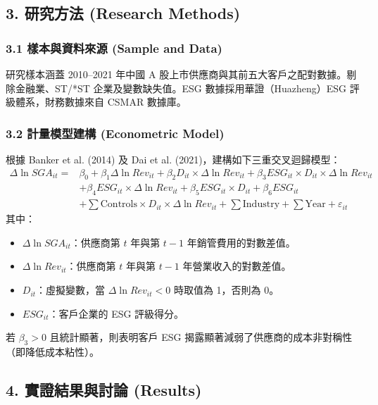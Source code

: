 \documentclass[11pt,a4paper]{article}
\begin{document}
\subsection{3. 研究方法 (Research Methods)}

\subsubsection{3.1 樣本與資料來源 (Sample and Data)}
研究樣本涵蓋 2010--2021 年中國 A 股上市供應商與其前五大客戶之配對數據。剔除金融業、ST/*ST 企業及變數缺失值。ESG 數據採用華證（Huazheng）ESG 評級體系，財務數據來自 CSMAR 數據庫。

\subsubsection{3.2 計量模型建構 (Econometric Model)}
根據 Banker et al. (2014) 及 Dai et al. (2021)，建構如下三重交叉迴歸模型：
\begin{equation}
\begin{aligned}
\Delta \ln SGA_{it} = & \beta_0 + \beta_1 \Delta \ln Rev_{it} + \beta_2 D_{it} \times \Delta \ln Rev_{it} + \beta_3 ESG_{it} \times D_{it} \times \Delta \ln Rev_{it} \\
& + \beta_4 ESG_{it} \times \Delta \ln Rev_{it} + \beta_5 ESG_{it} \times D_{it} + \beta_6 ESG_{it} \\
& + \sum \text{Controls} \times D_{it} \times \Delta \ln Rev_{it} + \sum \text{Industry} + \sum \text{Year} + \varepsilon_{it}
\end{aligned}
\end{equation}
其中：
\begin{itemize}
    \item $\Delta \ln SGA_{it}$：供應商第 $t$ 年與第 $t-1$ 年銷管費用的對數差值。
    \item $\Delta \ln Rev_{it}$：供應商第 $t$ 年與第 $t-1$ 年營業收入的對數差值。
    \item $D_{it}$：虛擬變數，當 $\Delta \ln Rev_{it} < 0$ 時取值為 1，否則為 0。
    \item $ESG_{it}$：客戶企業的 ESG 評級得分。
\end{itemize}
若 $\beta_3 > 0$ 且統計顯著，則表明客戶 ESG 揭露顯著減弱了供應商的成本非對稱性（即降低成本粘性）。

\subsection{4. 實證結果與討論 (Results)}
\end{document}
